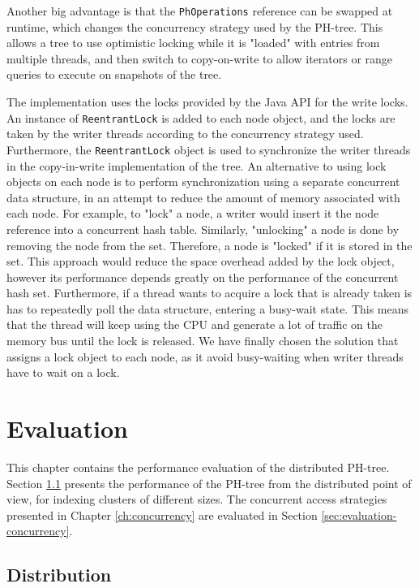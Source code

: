 \documentclass[11pt,a4paper]{globis-book}
\begin{document}
Another big advantage is that the \texttt{PhOperations} reference can be swapped at runtime, which changes the concurrency strategy used by the PH-tree. This allows a tree to use optimistic locking while it is "loaded" with entries from multiple threads, and then switch to copy-on-write to allow iterators or range queries to execute on snapshots of the tree. 

The implementation uses the locks provided by the Java API for the write locks. An instance of \texttt{ReentrantLock} is added to each node object, and the locks are taken by the writer threads according to the concurrency strategy used. Furthermore, the \texttt{ReentrantLock} object is used to synchronize the writer threads in the copy-in-write implementation of the tree. An alternative to using lock objects on each node is to perform synchronization using a separate concurrent data structure, in an attempt to reduce the amount of memory associated with each node. For example, to "lock" a node, a writer would insert it the node reference into a concurrent hash table. Similarly, "unlocking" a node is done by removing the node from the set. Therefore, a node is "locked" if it is stored in the set. This approach would reduce the space overhead added by the lock object, however its performance depends greatly on the performance of the concurrent hash set. Furthermore, if a thread wants to acquire a lock that is already taken is has to repeatedly poll the data structure, entering a busy-wait state. This means that the thread will keep using the CPU and generate a lot of traffic on the memory bus until the lock is released. We have finally chosen the solution that assigns a lock object to each node, as it avoid busy-waiting when writer threads have to wait on a lock.  
\chapter{Evaluation}
\label{ch:evaluation}

This chapter contains the performance evaluation of the distributed PH-tree. Section \ref{sec:evalution-distribution} presents the performance of the PH-tree from the distributed point of view, for indexing clusters of different sizes. The concurrent access strategies presented in Chapter \ref{ch:concurrency} are evaluated in Section \ref{sec:evaluation-concurrency}.

\section{Distribution}
\label{sec:evalution-distribution}
\end{document}
